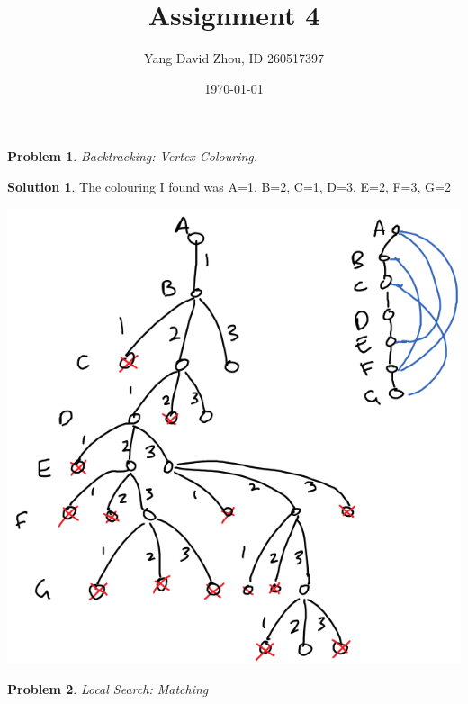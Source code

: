 \documentclass{article}
\newtheorem{problem}{Problem}
\theoremstyle{definition}
\newtheorem*{solution}{Solution}
\begin{document}
 \title{Assignment 4} 

\author{Yang David Zhou, ID 260517397} 

\date{\today}

\maketitle

\begin{problem} 

Backtracking: Vertex Colouring.

\end{problem}

\begin{solution}

The colouring I found was A=1, B=2, C=1, D=3, E=2, F=3, G=2

\end{solution}

\includegraphics[scale=1]{a3q1} \\

\begin{problem} 

Local Search: Matching

\end{problem}
\end{document}
